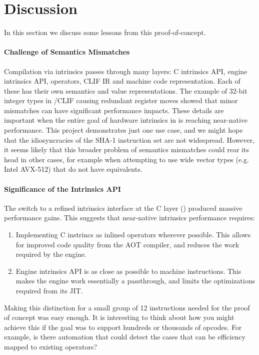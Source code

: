 \section{Discussion}
\label{sec:discussion}

In this section we discuss some lessons from this proof-of-concept.

\paragraph{Challenge of Semantics Mismatches}

Compilation via intrinsics passes through many layers: C intrinsics API, engine
intrinsics API, \wasm operators, CLIF IR and machine code representation. Each
of these has their own semantics and value representations.  The example of
32-bit integer types in \wasm/CLIF causing redundant register moves showed that
minor mismatches can have significant performance impacts. These details are
important when the entire goal of hardware intrinsics in \wasm is reaching
near-native performance. This project demonstrates just one use case, and we
might hope that the idiosyncracies of the SHA-1 instruction set are not
widespread. However, it seems likely that this broader problem of semantics
mismatches could rear its head in other cases, for example when attempting to
use wide vector types (e.g. Intel AVX-512) that do not have \wasm equivalents.

\paragraph{Significance of the Intrinsics API}

The switch to a refined intrinsics interface at the C layer ()
produced massive performance gains. This suggests that near-native
intrinsics performance requires:
%
\begin{enumerate}
    \item Implementing C instrincs as inlined \wasm operators wherever possible.
    This allows for improved code quality from the AOT compiler, and reduces the
    work required by the engine.
    \item Engine intrinsics API is as close as possible to machine instructions.
    This makes the engine work essentially a passthrough, and limits the
    optimizations required from its JIT.
\end{enumerate}

Making this distinction for a small group of 12 instructions needed for the
proof of concept was easy enough.  It is interesting to think about how you
might achieve this if the goal was to support hundreds or thousands of opcodes.
For example, is there automation that could detect the cases that can be
efficiency mapped to existing \wasm operators?


